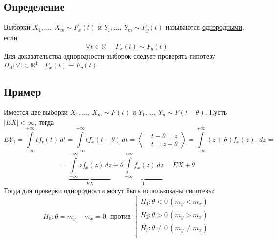 \documentclass[12pt, a4paper]{article}
\newcommand{\real}{\mathbb{R}}
\begin{document}
\subsection*{Определение}
Выборки $X_1,\dots,\ X_m \sim F_{x}(t)$ и $Y_1,\dots,\ Y_m \sim F_y(t)$ называются \underline{однородными}, если
\[\forall t \in \real^1\quad F_x(t) \sim F_y(t)\]
Для доказательства однородности выборок следует проверять гипотезу $H_0: \forall t\in \real^1\quad F_x(t) = F_y(t)$
\subsection*{Пример}
Имеется две выборки $X_1,\dots,\ X_m \sim F(t)$ и $Y_1,\dots,\ Y_n \sim F(t - \theta)$. Пусть $|EX| < \infty$, тогда
\[EY_1 = \int\limits_{-\infty}^{+\infty} tf_y(t)\, dt = \int\limits_{-\infty}^{+\infty} tf_x(t - \theta)\, dt = \left< \begin{aligned}
    &t - \theta = z\\
    &t = z + \theta 
\end{aligned} \right> = \int\limits_{-\infty}^{+\infty} (z + \theta) f_x(z),\ dz = \]
\[=\underset{EX}{\underbrace{\int\limits_{-\infty}^{+\infty} z f_x(z)\, dz}} + \theta \underset{1}{\underbrace{\int\limits_{-\infty}^{+\infty} f_x(z)\, dz}} = EX + \theta\]
Тогда для проверки однородности могут быть использованы гипотезы:
\[H_0: \theta = m_y - m_x = 0,\ \text{против } \left[ \begin{aligned}
    H_1: \theta < 0\ (m_y < m_x)\\
    H_2: \theta > 0\ (m_y > m_x)\\
    H_3: \theta \neq 0\ (m_y \neq m_x)\\
\end{aligned} \right.\]
\end{document}
